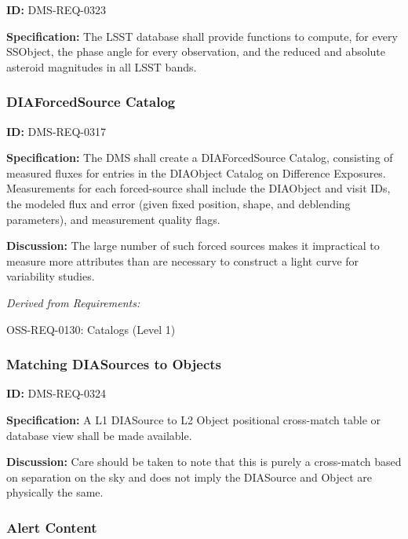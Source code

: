 \documentclass[SE,toc,lsstdraft]{lsstdoc}
\begin{document}
\label{DMS-REQ-0323}
\textbf{ID:} DMS-REQ-0323

\textbf{Specification:} The LSST database shall provide functions to compute, for every SSObject, the phase angle for every observation, and the reduced and absolute asteroid magnitudes in all LSST bands.






\subsubsection{DIAForcedSource Catalog}

\label{DMS-REQ-0317}
\textbf{ID:} DMS-REQ-0317

\textbf{Specification:} The DMS shall create a DIAForcedSource Catalog, consisting of measured fluxes for entries in the DIAObject Catalog on Difference Exposures. Measurements for each forced-source shall include the DIAObject and visit IDs, the modeled flux and error (given fixed position, shape, and deblending parameters), and measurement quality flags.

\textbf{Discussion: }The large number of such forced sources makes it impractical to measure more attributes than are necessary to construct a light curve for variability studies.




\emph{Derived from Requirements:}

OSS-REQ-0130:
Catalogs (Level 1) \newline


\subsubsection{Matching DIASources to Objects}

\label{DMS-REQ-0324}
\textbf{ID:} DMS-REQ-0324

\textbf{Specification:} A L1 DIASource to L2 Object positional cross-match table or database view shall be made available.

\textbf{Discussion:} Care should be taken to note that this is purely a cross-match based on separation on the sky and does not imply the DIASource and Object are physically the same.




\subsubsection{Alert Content}
\end{document}
